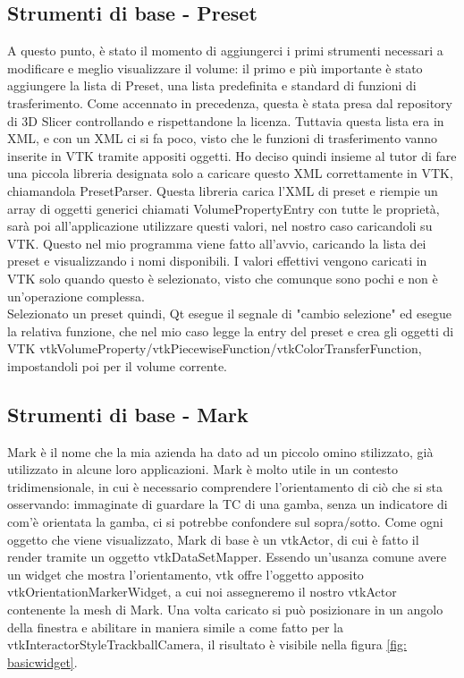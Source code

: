 \subsection{Strumenti di base - Preset}
A questo punto, è stato il momento di aggiungerci i primi strumenti necessari a modificare e meglio visualizzare il volume: il primo e più importante è stato aggiungere la lista di Preset, una lista predefinita e standard di funzioni di trasferimento. Come accennato in precedenza, questa è stata presa dal repository di 3D Slicer controllando e rispettandone la licenza. Tuttavia questa lista era in XML, e con un XML ci si fa poco, visto che le funzioni di trasferimento vanno inserite in VTK tramite appositi oggetti. Ho deciso quindi insieme al tutor di fare una piccola libreria designata solo a caricare questo XML correttamente in VTK, chiamandola PresetParser. Questa libreria carica l'XML di preset e riempie un array di oggetti generici chiamati VolumePropertyEntry con tutte le proprietà, sarà poi all'applicazione utilizzare questi valori, nel nostro caso caricandoli su VTK. Questo nel mio programma viene fatto all'avvio, caricando la lista dei preset e visualizzando i nomi disponibili. I valori effettivi vengono caricati in VTK solo quando questo è selezionato, visto che comunque sono pochi e non è un'operazione complessa.
\\
Selezionato un preset quindi, Qt esegue il segnale di "cambio selezione" ed esegue la relativa funzione, che nel mio caso legge la entry del preset e crea gli oggetti di VTK vtkVolumeProperty/vtkPiecewiseFunction/vtkColorTransferFunction, impostandoli poi per il volume corrente.

\subsection{Strumenti di base - Mark}
Mark è il nome che la mia azienda ha dato ad un piccolo omino stilizzato, già utilizzato in alcune loro applicazioni. Mark è molto utile in un contesto tridimensionale, in cui è necessario comprendere l'orientamento di ciò che si sta osservando: immaginate di guardare la TC di una gamba, senza un indicatore di com'è orientata la gamba, ci si potrebbe confondere sul sopra/sotto. Come ogni oggetto che viene visualizzato, Mark di base è un vtkActor, di cui è fatto il render tramite un oggetto vtkDataSetMapper. Essendo un'usanza comune avere un widget che mostra l'orientamento, vtk offre l'oggetto apposito vtkOrientationMarkerWidget, a cui noi assegneremo il nostro vtkActor contenente la mesh di Mark. Una volta caricato si può posizionare in un angolo della finestra e abilitare in maniera simile a come fatto per la vtkInteractorStyleTrackballCamera, il risultato è visibile nella figura \ref{fig: basicwidget}.

